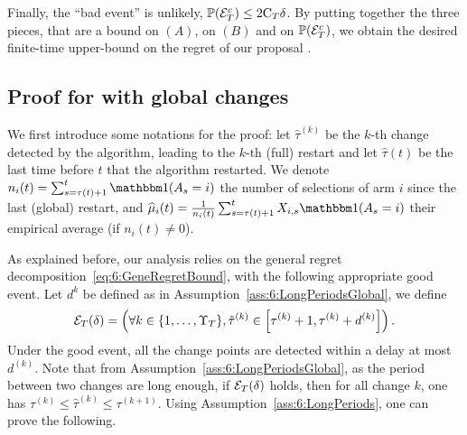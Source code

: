 Finally, the ``bad event'' is unlikely, $\mathbb{P}(\mathcal{E}_T^c) \leq 2\mathrm{C}_T \delta$.
By putting together the three pieces, that are a bound on $(A)$, on $(B)$ and on $\mathbb{P}(\mathcal{E}_T^c)$, we obtain the desired finite-time upper-bound on the regret of our proposal \GLRklUCB.





\subsection{Proof for \GLRklUCB{} with global changes}
\label{proof:6:mainRegretBoundGlobal}





We first introduce some notations for the proof:
let $\widehat{\tau}^{(k)}$ be the $k$-th change detected by the algorithm, leading to the $k$-th (full) restart and let $\widehat{\tau}(t)$ be the last time before $t$ that the algorithm restarted.
We denote $n_i(t) = \sum_{s=\tau(t)+1}^{t}\indic(A_s = i)$ the number of selections of arm $i$ since the last (global) restart, and $\widehat{\mu}_i(t) = \frac{1}{n_i(t)}\sum_{s=\tau(t)+1}^{t}X_{i,s}\indic(A_s = i)$ their empirical average (if $n_i(t) \neq 0$).

As explained before, our analysis relies on the general regret decomposition~\eqref{eq:6:GeneRegretBound}, with the following appropriate good event. Let $d^k$ be defined as in Assumption~\ref{ass:6:LongPeriodsGlobal}, we define
\begin{equation}\mathcal{E}_T(\delta) = \left( \forall k \in \{1, \ldots, \Upsilon_T\}, \hat{\tau}^{(k)} \in \left[\tau^{(k)} + 1, \tau^{(k)} + d^{(k)}\right] \right).\label{def:6:GoodEvenGlobal}\end{equation}
Under the good event, all the change points are detected within a delay at most $d^(k)$.
%
Note that from Assumption~\ref{ass:6:LongPeriodsGlobal}, as the period between two changes are long enough, if $\mathcal{E}_T(\delta)$ holds, then for all change $k$, one has $\tau^{(k)} \leq \hat{\tau}^{(k)} \leq \tau^{(k+1)}$. Using Assumption~\ref{ass:6:LongPeriods}, one can prove the following.

